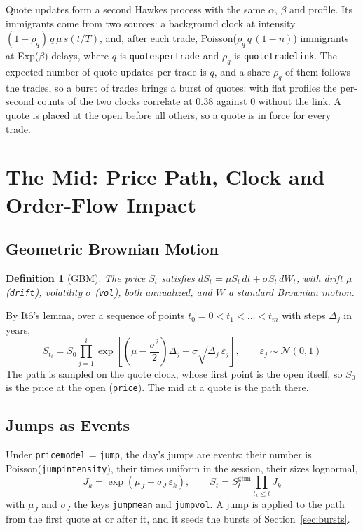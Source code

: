 \documentclass[11pt,a4paper]{article}
\newcommand{\key}[1]{\texttt{#1}}
\theoremstyle{paper}
\newtheorem{definition}{Definition}
\begin{document}
Quote updates form a second Hawkes process with the same $\alpha$, $\beta$ and profile. Its immigrants come from two sources: a background clock at intensity $(1-\rho_q)\,q\,\mu\,s(t/T)$, and, after each trade, Poisson($\rho_q\,q\,(1-n)$) immigrants at Exp($\beta$) delays, where $q$ is \key{quotespertrade} and $\rho_q$ is \key{quotetradelink}. The expected number of quote updates per trade is $q$, and a share $\rho_q$ of them follows the trades, so a burst of trades brings a burst of quotes: with flat profiles the per-second counts of the two clocks correlate at 0.38 against 0 without the link. A quote is placed at the open before all others, so a quote is in force for every trade.

\section{The Mid: Price Path, Clock and Order-Flow Impact}

\subsection{Geometric Brownian Motion}

\begin{definition}[GBM]
The price $S_t$ satisfies $dS_t=\mu S_t\,dt+\sigma S_t\,dW_t$, with drift $\mu$ (\key{drift}), volatility $\sigma$ (\key{vol}), both annualized, and $W$ a standard Brownian motion.
\end{definition}

\noindent By It\^o's lemma, over a sequence of points $t_0=0<t_1<\dots<t_m$ with steps $\Delta_j$ in years,
\begin{equation}
S_{t_i}=S_0\prod_{j=1}^{i}\exp\!\left[\left(\mu-\frac{\sigma^2}{2}\right)\Delta_j+\sigma\sqrt{\Delta_j}\,\varepsilon_j\right],\qquad \varepsilon_j\sim\mathcal N(0,1)
\end{equation}
The path is sampled on the quote clock, whose first point is the open itself, so $S_0$ is the price at the open (\key{price}). The mid at a quote is the path there.

\subsection{Jumps as Events}\label{sec:jumps}

Under \key{pricemodel} = \key{jump}, the day's jumps are events: their number is Poisson(\key{jumpintensity}), their times uniform in the session, their sizes lognormal,
\begin{equation}
J_k=\exp\left(\mu_J+\sigma_J\,\varepsilon_k\right),\qquad S_t=S_t^{\text{gbm}}\prod_{t_k\le t}J_k
\end{equation}
with $\mu_J$ and $\sigma_J$ the keys \key{jumpmean} and \key{jumpvol}. A jump is applied to the path from the first quote at or after it, and it seeds the bursts of Section~\ref{sec:bursts}.
\end{document}
